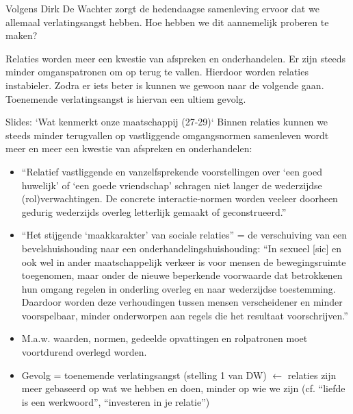 \documentclass[main.tex]{subfiles}
\begin{document}
\begin{examenvraag}
    \begin{vraag}
        Volgens Dirk De Wachter zorgt de hedendaagse samenleving ervoor dat we allemaal verlatingsangst hebben. Hoe hebben we dit aannemelijk proberen te maken?
    \end{vraag}

    \begin{antwoord}
        Relaties worden meer een kwestie van afspreken en onderhandelen.
        Er zijn steeds minder omganspatronen om op terug te vallen.
        Hierdoor worden relaties instabieler.
        Zodra er iets beter is kunnen we gewoon naar de volgende gaan.
        Toenemende verlatingsangst is hiervan een ultiem gevolg.
        \begin{citaat}{Slides: `Wat kenmerkt onze maatschappij (27-29)`}
            Binnen relaties kunnen we steeds minder terugvallen op vastliggende omgangsnormen samenleven wordt meer en meer een kwestie van afspreken en onderhandelen:
            \begin{itemize}
                \item ``Relatief vastliggende en vanzelfsprekende voorstellingen over `een goed huwelijk' of `een goede vriendschap' schragen niet langer de wederzijdse (rol)verwachtingen.
                    De concrete interactie-normen worden veeleer doorheen gedurig wederzijds overleg letterlijk gemaakt of geconstrueerd.''
                \item ``Het stijgende ‘maakkarakter’ van sociale relaties'' = de verschuiving van een bevelshuishouding naar een onderhandelingshuishouding:
                    ``In sexueel [sic] en ook wel in ander maatschappelijk verkeer is voor mensen de bewegingsruimte toegenomen, maar onder de nieuwe beperkende voorwaarde dat betrokkenen hun omgang regelen in onderling overleg en naar wederzijdse toestemming.
                    Daardoor worden deze verhoudingen tussen mensen verscheidener en minder voorspelbaar, minder onderworpen aan regels die het resultaat voorschrijven.''
                \item M.a.w. waarden, normen, gedeelde opvattingen en rolpatronen moet voortdurend overlegd worden.
                \item Gevolg = toenemende verlatingsangst (stelling 1 van DW) $\leftarrow$ relaties zijn meer gebaseerd op wat we hebben en doen, minder op wie we zijn (cf. ``liefde is een werkwoord'', ``investeren in je relatie'')
            \end{itemize}
        \end{citaat}
    \end{antwoord}
\end{examenvraag}
\end{document}
